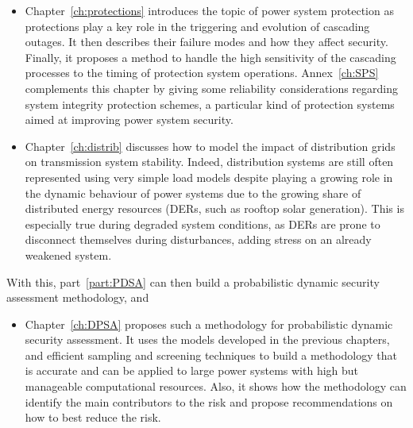 \begin{itemize}
    \item Chapter~\ref{ch:protections} introduces the topic of power system protection as protections play a key role in the triggering and evolution of cascading outages. It then describes their failure modes and how they affect security. Finally, it proposes a method to handle the high sensitivity of the cascading processes to the timing of protection system operations. Annex~\ref{ch:SPS} complements this chapter by giving some reliability considerations regarding system integrity protection schemes, a particular kind of protection systems aimed at improving power system security.
    \item Chapter~\ref{ch:distrib} discusses how to model the impact of distribution grids on transmission system stability. Indeed, distribution systems are still often represented using very simple load models despite playing a growing role in the dynamic behaviour of power systems due to the growing share of distributed energy resources (DERs, such as rooftop solar generation). This is especially true during degraded system conditions, as DERs are prone to disconnect themselves during disturbances, adding stress on an already weakened system.
\end{itemize}

With this, part~\ref{part:PDSA} can then build a probabilistic dynamic security assessment methodology, and

\begin{itemize}
    \item Chapter~\ref{ch:DPSA} proposes such a methodology for probabilistic dynamic security assessment. It uses the models developed in the previous chapters, and efficient sampling and screening techniques to build a methodology that is accurate and can be applied to large power systems with high but manageable computational resources. Also, it shows how the methodology can identify the main contributors to the risk and propose recommendations on how to best reduce the risk.
\end{itemize}

